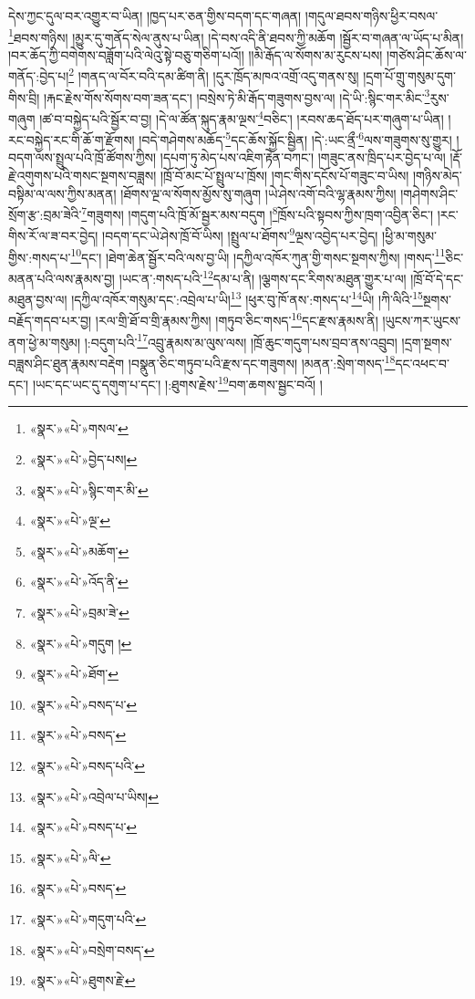 དེས་ཀྱང་དུལ་བར་འགྱུར་བ་ཡིན། །ཁྱད་པར་ཅན་གྱིས་བདག་དང་གཞན། །གདུལ་ཐབས་གཉིས་ཕྱིར་བསལ་\footnote{«སྣར་»«པེ་»གསལ་}ཐབས་གཉིས། །མྱུར་དུ་གནོད་སེལ་ནུས་པ་ཡིན། །དེ་བས་འདི་ནི་ཐབས་ཀྱི་མཆོག །སྦྱོར་བ་གཞན་ལ་ཡོད་པ་མིན། །བར་ཆོད་ཀྱི་བགེགས་བཟློག་པའི་ལེའུ་སྟེ་བཅུ་གཅིག་པའོ།། །།མི་རྒོད་ལ་སོགས་མ་རུངས་པས། །གཙེས་ཤིང་ཆོས་ལ་གནོད་:བྱེད་པ།\footnote{«སྣར་»«པེ་»བྱེད་པས།} །གནད་ལ་བོར་བའི་དམ་ཚིག་ནི། །དུར་ཁྲོད་མཁའ་འགྲོ་འདུ་གནས་སུ། །དྲག་པོ་གྲུ་གསུམ་དུག་གིས་བྲི། །རྐང་རྗེས་གོས་སོགས་བག་ཟན་དང་། །བསྲེས་ཏེ་མི་རྒོད་གཟུགས་བྱས་ལ། །དེ་ཡི་:སྙིང་གར་མིང་\footnote{«སྣར་»«པེ་»སྙིང་གར་མི་}རུས་གཞུག །ཚ་བ་བསྐྱེད་པའི་སྦྱོར་བ་བྱ། །དེ་ལ་ཚོན་སྐུད་རྣམ་ལྔས་\footnote{«སྣར་»«པེ་»ལྔ་}བཅིང་། །རབས་ཆད་ཐོད་པར་གཞུག་པ་ཡིན། །རང་བསྐྱེད་རང་གི་ཆོ་ག་རྫོགས། །བདེ་གཤེགས་མཆོད་\footnote{«སྣར་»«པེ་»མཆོག་}དང་ཆོས་སྐྱོང་སྦྱིན། །དེ་:ཡང་ནྲྀ་\footnote{«སྣར་»«པེ་»འོད་ནི་}ལས་གཟུགས་སུ་གྱུར། །བདག་ལས་སྤྲུལ་པའི་ཁྲོ་ཚོགས་ཀྱིས། །དཔག་ཏུ་མེད་པས་འཇིག་རྟེན་བཀང་། །གཟུང་ནས་ཁྲིད་པར་བྱེད་པ་ལ། །རྡོ་རྗེ་འགུགས་པའི་གསང་སྔགས་བཟླས། །ཁྲོ་བོ་མང་པོ་སྤྲུལ་པ་ཁྲོས། །གང་གིས་དངོས་པོ་གཟུང་བ་ཡིས། །གཉིས་མེད་བསྟིམ་ལ་ལས་ཀྱིས་མནན། །ཐོགས་ལྔ་ལ་སོགས་མྱོས་སུ་གཞུག །ཡེ་ཤེས་འགོ་བའི་ལྷ་རྣམས་ཀྱིས། །གཤེགས་ཤིང་སྲོག་རྩ་:བྲམ་ཟེའི་\footnote{«སྣར་»«པེ་»བྲམ་ཟེ་}གཟུགས། །གདུག་པའི་ཁྲོ་མོ་སྦྱར་མས་བདུག །\footnote{«སྣར་»«པེ་»གདུག །}ཁྲོས་པའི་སྟབས་ཀྱིས་ཁྲག་འབྱིན་ཅིང་། །རང་གིས་རོ་ལ་ཟ་བར་བྱེད། །བདག་དང་ཡེ་ཤེས་ཁྲོ་བོ་ཡིས། །སྤྲུལ་པ་ཐོགས་\footnote{«སྣར་»«པེ་»ཐོག་}ལྔས་འབྱེད་པར་བྱེད། །ཕྱི་མ་གསུམ་གྱིས་:གསད་པ་\footnote{«སྣར་»«པེ་»བསད་པ་}དང་། །ཐེག་ཆེན་སྦྱོར་བའི་ལས་བྱ་ཡི། །དཀྱིལ་འཁོར་ཀུན་གྱི་གསང་སྔགས་ཀྱིས། །གསད་\footnote{«སྣར་»«པེ་»བསད་}ཅིང་མནན་པའི་ལས་རྣམས་བྱ། །ཡང་ན་:གསད་པའི་\footnote{«སྣར་»«པེ་»བསད་པའི་}དམ་པ་ནི། །ལྕགས་དང་རིགས་མཐུན་གྱུར་པ་ལ། །ཁྲོ་བོ་དེ་དང་མཐུན་བྱས་ལ། །དཀྱིལ་འཁོར་གསུམ་དང་:འབྲེལ་པ་ཡི།\footnote{«སྣར་»«པེ་»འབྲེལ་པ་ཡིས།} །ཕུར་བུ་ཁོ་ནས་:གསད་པ་\footnote{«སྣར་»«པེ་»བསད་པ་}ཡི། །ཀི་ལིའི་\footnote{«སྣར་»«པེ་»ལི་}སྔགས་བརྗོད་གདབ་པར་བྱ། །རལ་གྲི་ཐོ་བ་གྲི་རྣམས་ཀྱིས། །གཏུབ་ཅིང་གསད་\footnote{«སྣར་»«པེ་»བསད་}དང་རྫས་རྣམས་ནི། །ཡུངས་ཀར་ཡུངས་ནག་ཕྱེ་མ་གསུམ། །:བདུག་པའི་\footnote{«སྣར་»«པེ་»གདུག་པའི་}འབྲུ་རྣམས་མ་ལུས་ལས། །ཁྲོ་ཆུང་གདུག་པས་བྲབ་ནས་འབྲུབ། །དྲག་སྔགས་བཟླས་ཤིང་ཐུན་རྣམས་བརྡེག །བསྣུན་ཅིང་གཏུབ་པའི་རྫས་དང་གཟུགས། །མནན་:སྲེག་གསད་\footnote{«སྣར་»«པེ་»བསྲེག་བསད་}དང་འཕང་བ་དང་། །ཡང་དང་ཡང་དུ་དགུག་པ་དང་། །:ཐུགས་རྗེས་\footnote{«སྣར་»«པེ་»ཐུགས་རྗེ་}བག་ཆགས་སྦྱང་བའོ། །
